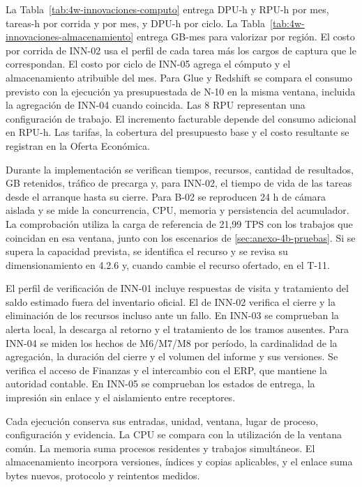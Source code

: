 La Tabla~\ref{tab:4w-innovaciones-computo} entrega DPU-h y RPU-h por mes, tareas-h por corrida y por mes, y DPU-h por ciclo. La Tabla~\ref{tab:4w-innovaciones-almacenamiento} entrega GB-mes para valorizar por región. El costo por corrida de INN-02 usa el perfil de cada tarea más los cargos de captura que le correspondan. El costo por ciclo de INN-05 agrega el cómputo y el almacenamiento atribuible del mes. Para Glue y Redshift se compara el consumo previsto con la ejecución ya presupuestada de N-10 en la misma ventana, incluida la agregación de INN-04 cuando coincida. Las 8 RPU representan una configuración de trabajo. El incremento facturable depende del consumo adicional en RPU-h. Las tarifas, la cobertura del presupuesto base y el costo resultante se registran en la Oferta Económica.

Durante la implementación se verifican tiempos, recursos, cantidad de resultados, GB retenidos, tráfico de precarga y, para INN-02, el tiempo de vida de las tareas desde el arranque hasta su cierre. Para B-02 se reproducen 24 h de cámara aislada y se mide la concurrencia, CPU, memoria y persistencia del acumulador. La comprobación utiliza la carga de referencia de 21,99 TPS con los trabajos que coincidan en esa ventana, junto con los escenarios de \ref{sec:anexo-4b-pruebas}. Si se supera la capacidad prevista, se identifica el recurso y se revisa su dimensionamiento en 4.2.6 y, cuando cambie el recurso ofertado, en el T-11.

El perfil de verificación de INN-01 incluye respuestas de visita y tratamiento del saldo estimado fuera del inventario oficial. El de INN-02 verifica el cierre y la eliminación de los recursos incluso ante un fallo. En INN-03 se comprueban la alerta local, la descarga al retorno y el tratamiento de los tramos ausentes. Para INN-04 se miden los hechos de M6/M7/M8 por período, la cardinalidad de la agregación, la duración del cierre y el volumen del informe y sus versiones. Se verifica el acceso de Finanzas y el intercambio con el ERP, que mantiene la autoridad contable. En INN-05 se comprueban los estados de entrega, la impresión sin enlace y el aislamiento entre receptores.

Cada ejecución conserva sus entradas, unidad, ventana, lugar de proceso, configuración y evidencia. La CPU se compara con la utilización de la ventana común. La memoria suma procesos residentes y trabajos simultáneos. El almacenamiento incorpora versiones, índices y copias aplicables, y el enlace suma bytes nuevos, protocolo y reintentos medidos.


